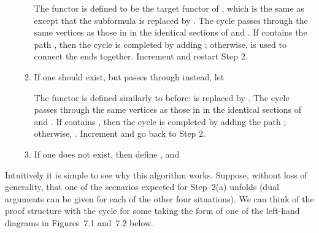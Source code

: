 \documentclass{LMCS}
\theoremstyle{plain}\newtheorem*{cLm}{Claim}
\begin{document}
\begin{enumerate}
\begin{enumerate}
    The functor  is defined to be the target functor of , which is the same as  except that the subformula  is replaced by . The cycle  passes through the same vertices as those in  in the identical sections of  and . If  contains the path , then the cycle  is completed by adding ; otherwise,  is used to connect the ends together. Increment  and restart Step 2.
    	\item If one should exist, but  passes through  instead, let 
    	
    	The functor  is defined similarly to before:  is replaced by . The cycle  passes through the same vertices as those in  in the identical sections of  and . If  contains , then the cycle  is completed by adding the path ; otherwise, . Increment  and go back to Step 2.
    	\item If one does not exist, then define ,  and 
    	\end{enumerate}
    \end{enumerate}
    
\noindent     Intuitively it is simple to see why this algorithm works. Suppose, without loss of generality, that one of the scenarios expected for Step~2(a) unfolds (dual arguments can be given for each of the other four situations). We can think of the proof structure with the cycle  for some  taking the form of one of the left-hand diagrams in Figures~7.1 and~7.2 below.
    
\end{document}
